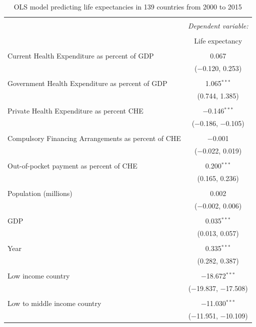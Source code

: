 \documentclass[]{elsarticle} %
\begin{document}
\begin{table}[!htbp] \centering 
  \caption{OLS model predicting life expectancies in 139 countries from 2000 to 2015} 
  \label{poolOLS} 
\begin{tabular}{@{\extracolsep{5pt}}lc} 
\\[-1.8ex]\hline 
\hline \\[-1.8ex] 
 & \multicolumn{1}{c}{\textit{Dependent variable:}} \\ 
\cline{2-2} 
\\[-1.8ex] & Life expectancy \\ 
\hline \\[-1.8ex] 
 Current Health Expenditure as percent of GDP & 0.067 \\ 
  & ($-$0.120, 0.253) \\ 
  & \\ 
 Government Health Expenditure as percent of GDP & 1.065$^{***}$ \\ 
  & (0.744, 1.385) \\ 
  & \\ 
 Private Health Expenditure as percent CHE & $-$0.146$^{***}$ \\ 
  & ($-$0.186, $-$0.105) \\ 
  & \\ 
 Compulsory Financing Arrangements as percent of CHE & $-$0.001 \\ 
  & ($-$0.022, 0.019) \\ 
  & \\ 
 Out-of-pocket payment as percent of CHE & 0.200$^{***}$ \\ 
  & (0.165, 0.236) \\ 
  & \\ 
 Population (millions) & 0.002 \\ 
  & ($-$0.002, 0.006) \\ 
  & \\ 
 GDP & 0.035$^{***}$ \\ 
  & (0.013, 0.057) \\ 
  & \\ 
 Year & 0.335$^{***}$ \\ 
  & (0.282, 0.387) \\ 
  & \\ 
 Low income country & $-$18.672$^{***}$ \\ 
  & ($-$19.837, $-$17.508) \\ 
  & \\ 
 Low to middle income country & $-$11.030$^{***}$ \\ 
  & ($-$11.951, $-$10.109) \\ 

\end{tabular}
\end{table}
\end{document}
